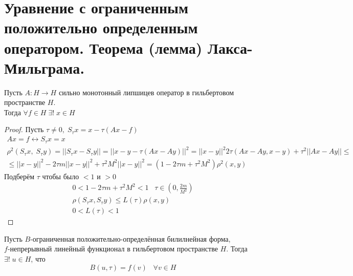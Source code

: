 \documentclass[__main__.tex]{subfiles}
\begin{document}
\section{Уравнение с ограниченным положительно определенным оператором. Теорема (лемма) Лакса-Мильграма.}

\begin{theorem}
	Пусть $A: H\rightarrow H$ сильно монотонный липшицев оператор в гильбертовом пространстве $H$. \\
	Тогда $\forall f \in H \;\exists!\; x \in H$
\end{theorem} 
\begin{proof}
	Пусть $\tau \neq 0, \; S_\tau x = x - \tau(Ax - f)$
	\begin{gather*}
		Ax = f \leftrightarrow S_\tau x = x\\
		\rho^2(S_\tau x, \; S_\tau y) = ||S_\tau x - S_\tau y|| = ||x - y - \tau(Ax - Ay)||^2 = ||x - y||^2 2\tau(Ax - Ay, x-y) + \tau^2||Ax - Ay|| \leq \\
		\leq ||x-y||^2 - 2\tau m||x-y||^2 + \tau^2M^2||x-y||^2 = (1-2\tau m+\tau^2M^2)\rho^2(x,y)
	\end{gather*}
Подберём $\tau$ чтобы было $<1$ и $>0$
\begin{gather*}
	0 < 1 - 2\tau m + \tau^2 M^2 < 1 \;\;\; \tau\in(0, \frac{2m}{M^2})\\
	\rho(S_\tau x, S_\tau y) \leq L(\tau)\rho(x,y)\\
	0 < L(\tau) < 1
\end{gather*}
\end{proof}
\begin{theorem}
	Пусть $B$-ограниченная положительно-определённая билилнейная форма,\\ $f$-непрерывный линейный функционал в гильбертовом пространстве $H$. Тогда $\exists!\;u \in H$, что
	$$
	B(u, \tau) = f(v) \;\;\; \forall v \in H
	$$
\end{theorem}
\end{document}
